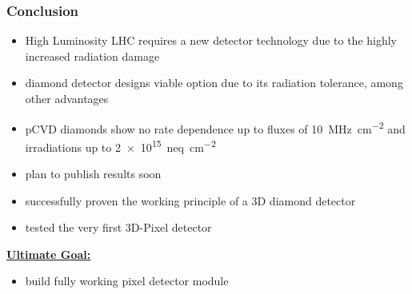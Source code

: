 \begin{frame}
	\frametitle{Conclusion}
	\begin{itemize}
		\setlength{\itemsep}{\fill}
		\item High Luminosity LHC requires a new detector technology due to the highly increased radiation damage 
		\item diamond detector designs viable option due to its radiation tolerance, among other advantages
		\item pCVD diamonds show no rate dependence up to fluxes of \SI{10}{\mega\hertz\per cm^2} and irradiations up to \SI{2e15}{neq\per cm^2}
		\item plan to publish results soon
		\item successfully proven the working principle of a 3D diamond detector
		\item tested the very first 3D-Pixel detector
	\end{itemize}
	\vspace*{5pt}
	\textbf{\underline{Ultimate Goal:}}
	\begin{itemize}
		\item build fully working pixel detector module
	\end{itemize}
\end{frame}